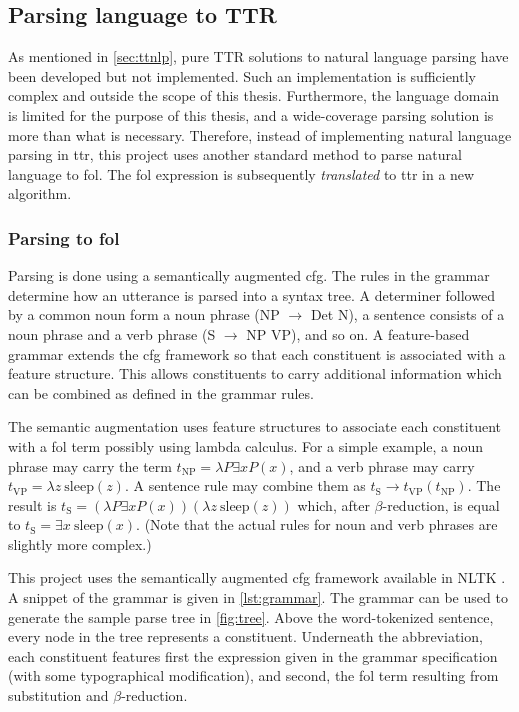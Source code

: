 \subsection{Parsing language to TTR}
\label{sec:parsing}

As mentioned in \autoref{sec:ttnlp}, pure TTR solutions to natural language parsing have been developed but not implemented.
Such an implementation is sufficiently complex and outside the scope of this thesis.
Furthermore, the language domain is limited for the purpose of this thesis, and a wide-coverage parsing solution is more than what is necessary.
Therefore, instead of implementing natural language parsing in \gls{ttr}, this project uses
another standard method to parse natural language to \gls{fol}.
The \gls{fol} expression is subsequently \textit{translated} to \gls{ttr} in a new algorithm.

\subsubsection{Parsing to \acrlong{fol}}

Parsing is done using a semantically augmented \gls{cfg}.
The rules in the grammar determine how an utterance is parsed into a syntax tree.
A determiner followed by a common noun form a noun phrase (NP $\rightarrow$ Det N), a sentence consists of a noun phrase and a verb phrase (S $\rightarrow$ NP VP), and so on.
A feature-based grammar extends the \gls{cfg} framework so that each constituent is associated with a feature structure.
This allows constituents to carry additional information which can be combined as defined in the grammar rules.

The semantic augmentation uses feature structures to associate each constituent with a \gls{fol} term possibly using lambda calculus.
For a simple example, a noun phrase may carry the term $t_{\text{NP}} = \lambda P \exists x P(x)$, and a verb phrase may carry $t_\text{VP} = \lambda z \ \text{sleep}(z)$.
A sentence rule may combine them as $t_\text{S} \rightarrow t_\text{VP}(t_\text{NP})$.
The result is $t_\text{S} = (\lambda P \exists x P(x)) (\lambda z \ \text{sleep}(z))$ which, after $\beta$-reduction, is equal to $t_\text{S} = \exists x \ \text{sleep}(x)$.
(Note that the actual rules for noun and verb phrases are slightly more complex.)

This project uses the semantically augmented \gls{cfg} framework available in NLTK \citep{nltk}.
A snippet of the grammar is given in \autoref{lst:grammar}.
The grammar can be used to generate the sample parse tree in \autoref{fig:tree}.
Above the word-tokenized sentence, every node in the tree represents a constituent.
Underneath the abbreviation, each constituent features first the expression given in the grammar specification (with some typographical modification), and second, the \gls{fol} term resulting from substitution and $\beta$-reduction.

